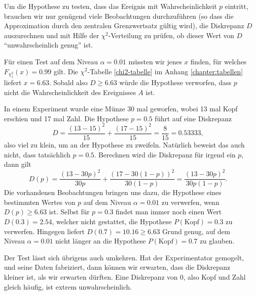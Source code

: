 Um die Hypothese zu testen, dass das Ereignis mit Wahrscheinlichkeit $p$
eintritt, brauchen wir nur genügend viele Beobachtungen durchzuführen
(so dass die Approximation durch den zentralen Grenzwertsatz gültig wird),
die Diskrepanz $D$ auszurechnen und mit Hilfe der $\chi^2$-Verteilung
zu prüfen, ob dieser Wert von $D$ ``unwahrscheinlich genug'' ist.

Für einen Test auf dem Niveau $\alpha=0.01$ müssten wir jenes
$x$ finden, für welches $F_{\chi^2_1}(x)=0.99$ gilt.
Die $\chi^2$-Tabelle \ref{chi2-tabelle} im Anhang \ref{chapter:tabellen}
liefert $x=6.63$.
Sobald also $D\ge 6.63$ würde die Hypothese verworfen,
dass $p$ nicht die Wahrscheinlichkeit des Ereignisses $A$ ist.

In einem Experiment wurde eine Münze 30 mal geworfen, wobei 13 mal
Kopf erschien und 17 mal Zahl.
Die Hypothese $p=0.5$ führt auf eine
Diskrepanz 
\[
D=\frac{(13-15)^2}{15}+\frac{(17-15)^2}{15}=\frac{8}{15}=0.53333,
\]
also viel zu klein, um an der Hypothese zu zweifeln.
Natürlich beweist das auch nicht, dass tatsächlich $p=0.5$.
Berechnen wird die Diskrepanz für irgend ein $p$, dann gilt
\[
D(p)=\frac{(13-30p)^2}{30p}+\frac{(17-30(1-p))^2}{30(1-p)}
=\frac{(13-30p)^2}{30p(1-p)}.
\]
Die vorhandenen Beobachtungen bringen uns dazu, die Hypothese eines
bestimmten Wertes von $p$ auf dem Niveau $\alpha=0.01$ zu verwerfen,
wenn $D(p)\ge 6.63$ ist.
Selbst für $p=0.3$ findet man immer noch einen
Wert $D(0.3)=2.54$, welcher nicht gestattet,
die Hypothese $P(\text{Kopf})=0.3$ zu verwerfen.
Hingegen liefert 
$D(0.7)=10.16\ge 6.63$ Grund genug, auf dem Niveau $\alpha=0.01$ nicht
länger an die Hypothese $P(\text{Kopf})=0.7$ zu glauben.

Der Test lässt sich übrigens auch umkehren.
Hat der Experimentator
gemogelt, und seine Daten fabriziert, dann können wir erwarten, dass
die Diskrepanz kleiner ist, als wir erwarten dürften.
Eine Diskrepanz
von $0$, also Kopf und Zahl gleich häufig, ist extrem unwahrscheinlich.

